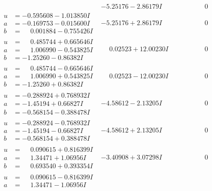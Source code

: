 \documentclass[1p]{elsarticle_modified}
\theoremstyle{definition}
\begin{document}
$$\begin{array}{c|c|c}
 & -5.25176 - 2.86179 I & \phantom{-0.000000 } 0 \\ \hline\begin{aligned}
u &= -0.595608 - 1.013850 I \\
a &= -0.169753 - 0.015600 I \\
b &= \phantom{-}0.001884 - 0.755426 I\end{aligned}
 & -5.25176 + 2.86179 I & \phantom{-0.000000 } 0 \\ \hline\begin{aligned}
u &= \phantom{-}0.485744 + 0.665646 I \\
a &= \phantom{-}1.006990 - 0.543825 I \\
b &= -1.25260 - 0.86382 I\end{aligned}
 & \phantom{-}0.02523 + 12.00230 I & \phantom{-0.000000 } 0 \\ \hline\begin{aligned}
u &= \phantom{-}0.485744 - 0.665646 I \\
a &= \phantom{-}1.006990 + 0.543825 I \\
b &= -1.25260 + 0.86382 I\end{aligned}
 & \phantom{-}0.02523 - 12.00230 I & \phantom{-0.000000 } 0 \\ \hline\begin{aligned}
u &= -0.288924 + 0.768932 I \\
a &= -1.45194 + 0.66827 I \\
b &= -0.568154 - 0.388478 I\end{aligned}
 & -4.58612 - 2.13205 I & \phantom{-0.000000 } 0 \\ \hline\begin{aligned}
u &= -0.288924 - 0.768932 I \\
a &= -1.45194 - 0.66827 I \\
b &= -0.568154 + 0.388478 I\end{aligned}
 & -4.58612 + 2.13205 I & \phantom{-0.000000 } 0 \\ \hline\begin{aligned}
u &= \phantom{-}0.090615 + 0.816399 I \\
a &= \phantom{-}1.34471 + 1.06956 I \\
b &= \phantom{-}0.693540 + 0.393354 I\end{aligned}
 & -3.40908 + 3.07298 I & \phantom{-0.000000 } 0 \\ \hline\begin{aligned}
u &= \phantom{-}0.090615 - 0.816399 I \\
a &= \phantom{-}1.34471 - 1.06956 I \\

\end{aligned}
\end{array}$$
\end{document}

